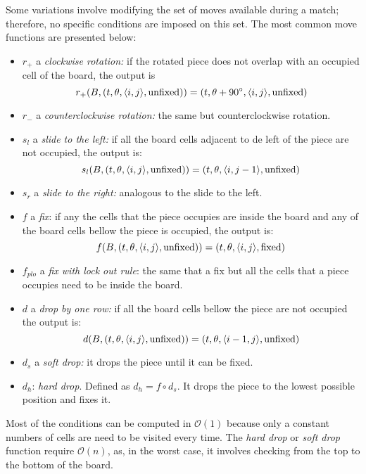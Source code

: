Some variations involve modifying the set of moves available during a match; therefore, no specific conditions are imposed on this set. The most common move functions are presented below:  

\begin{itemize}
  \item $r_+$ a \emph{clockwise rotation:} if the rotated piece does not overlap with an occupied cell of the board, the output is 
    $$r_+ (B, \piece[t][\theta][i][j][\text{unfixed}]) = \piece[t][\theta + 90^\circ][i][j][\text{unfixed}]$$

  \item $r_-$ a \emph{counterclockwise rotation:} the same but counterclockwise rotation. 

  \item $s_l$ a \emph{slide to the left:} if all the board cells adjacent to de left of the piece are not occupied, the output is:
    $$s_l (B, \piece[t][\theta][i][j][\text{unfixed}]) = \piece[t][\theta][i][j-1][\text{unfixed}]$$
  \item $s_r$ a \emph{slide to the right:} analogous to the slide to the left.

  \item $f$ a \emph{fix}: if any the cells that the piece occupies are inside the board and any of the board cells bellow the piece is occupied, the output is:
    $$f (B, \piece[t][\theta][i][j][\text{unfixed}]) = \piece[t][\theta][i][j][\text{fixed}]$$

  \item $f_{plo}$ a \emph{fix with lock out rule}: the same that a fix but all the cells that a piece occupies need to be inside the board. 

  \item $d$ a \emph{drop by one row:} if all the board cells bellow the piece are not occupied the output is:
    $$d (B, \piece[t][\theta][i][j][\text{unfixed}]) = \piece[t][\theta][i-1][j][\text{unfixed}]$$

  \item $d_s$ a \emph{soft drop:} it drops the piece until it can be fixed.
  \item $d_h$: \emph{hard drop}. Defined as $d_h = f \circ d_s$. It drops the piece to the lowest possible position and fixes it.
    
\end{itemize}

Most of the conditions can be computed in $\mathcal{O}(1)$  because only a constant numbers of cells are need to be visited every time. The \emph{hard drop} or \emph{soft drop} function require $\mathcal{O}(n)$, as, in the worst case, it involves checking from the top to the bottom of the board.  

